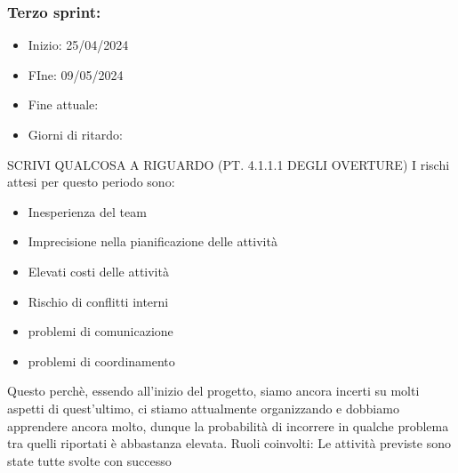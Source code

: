     \subsubsection{Terzo sprint:}
    \begin{itemize}
        \item Inizio: 25/04/2024
        \item FIne: 09/05/2024
        \item Fine attuale:
        \item Giorni di ritardo:
    \end{itemize}
    SCRIVI QUALCOSA A RIGUARDO (PT. 4.1.1.1 DEGLI OVERTURE)
    I rischi attesi per questo periodo sono:
    \begin{itemize}
        \item Inesperienza del team
        \item Imprecisione nella pianificazione delle attività
        \item Elevati costi delle attività
        \item Rischio di conflitti interni 
        \item problemi di comunicazione
        \item problemi di coordinamento
    \end{itemize}
    Questo perchè, essendo all’inizio del progetto, siamo ancora incerti su molti aspetti di quest’ultimo, ci stiamo attualmente organizzando e dobbiamo apprendere ancora molto, dunque la probabilità di incorrere in qualche problema tra quelli riportati è abbastanza elevata.
    Ruoli coinvolti: 
    Le attività previste sono state tutte svolte con successo

